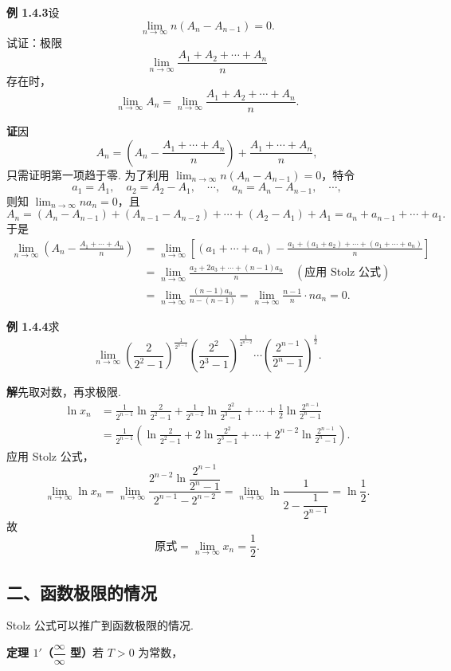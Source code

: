 \documentclass[UTF8, 12pt, fontset=fandol, oneside]{ctexart}
\begin{document}
\noindent\textbf{例 1.4.3}\quad 设
\[
  \lim_{n\to\infty}n(A_n-A_{n-1})=0.
\]
试证：极限
\[
  \lim_{n\to\infty}\frac{A_1+A_2+\cdots+A_n}{n}
\]
存在时，
\[
  \lim_{n\to\infty}A_n
  =\lim_{n\to\infty}\frac{A_1+A_2+\cdots+A_n}{n}.
\]

\noindent\textbf{证}\quad 因
\[
  A_n=\left(A_n-\frac{A_1+\cdots+A_n}{n}\right)+
  \frac{A_1+\cdots+A_n}{n},
\]
只需证明第一项趋于零. 为了利用 $\displaystyle\lim_{n\to\infty}n(A_n-A_{n-1})=0$，特令
\[
  a_1=A_1,\quad a_2=A_2-A_1,\quad\cdots,\quad
  a_n=A_n-A_{n-1},\quad\cdots,
\]
则知 $\displaystyle\lim_{n\to\infty}na_n=0$，且
\[
  A_n=(A_n-A_{n-1})+(A_{n-1}-A_{n-2})+\cdots+(A_2-A_1)+A_1
  =a_n+a_{n-1}+\cdots+a_1.
\]
于是
\[
\begin{aligned}
  \lim_{n\to\infty}\left(A_n-\frac{A_1+\cdots+A_n}{n}\right)
  &=\lim_{n\to\infty}\left[(a_1+\cdots+a_n)-
  \frac{a_1+(a_1+a_2)+\cdots+(a_1+\cdots+a_n)}n\right]\\
  &=\lim_{n\to\infty}\frac{a_2+2a_3+\cdots+(n-1)a_n}{n}
  \quad(\text{应用 Stolz 公式})\\
  &=\lim_{n\to\infty}\frac{(n-1)a_n}{n-(n-1)}
  =\lim_{n\to\infty}\frac{n-1}{n}\cdot na_n=0.
\end{aligned}
\]

\noindent\textbf{例 1.4.4}\quad 求
\[
  \lim_{n\to\infty}
  \left(\frac2{2^2-1}\right)^{\frac1{2^{n-1}}}
  \left(\frac{2^2}{2^3-1}\right)^{\frac1{2^{n-2}}}
  \cdots
  \left(\frac{2^{n-1}}{2^n-1}\right)^{\frac12}.
\]

\noindent\textbf{解}\quad 先取对数，再求极限.
\[
\begin{aligned}
  \ln x_n
  &=\frac1{2^{n-1}}\ln\frac2{2^2-1}
  +\frac1{2^{n-2}}\ln\frac{2^2}{2^3-1}
  +\cdots+\frac12\ln\frac{2^{n-1}}{2^n-1}\\
  &=\frac1{2^{n-1}}\left(\ln\frac2{2^2-1}
  +2\ln\frac{2^2}{2^3-1}
  +\cdots+2^{n-2}\ln\frac{2^{n-1}}{2^n-1}\right).
\end{aligned}
\]
应用 Stolz 公式，
\[
  \lim_{n\to\infty}\ln x_n
  =\lim_{n\to\infty}
  \frac{2^{n-2}\ln\dfrac{2^{n-1}}{2^n-1}}{2^{n-1}-2^{n-2}}
  =\lim_{n\to\infty}\ln\frac1{2-\dfrac1{2^{n-1}}}
  =\ln\frac12.
\]
故
\[
  \text{原式}=\lim_{n\to\infty}x_n=\frac12.
\]

\subsection*{二、函数极限的情况}

Stolz 公式可以推广到函数极限的情况.

\noindent\textbf{定理 $1'$（$\dfrac\infty\infty$ 型）}\quad 若 $T>0$ 为常数，
\end{document}

